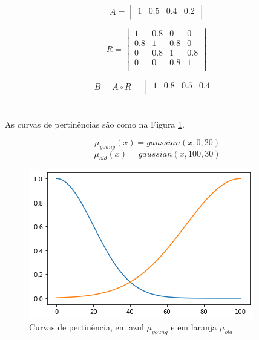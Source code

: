 \documentclass[conference]{IEEEtran}
\newcommand\w{1.0}
\begin{document}
\hfill
\section{}  %

\[
A = 
\begin{vmatrix}
1 & 0.5 & 0.4 & 0.2 \\
\end{vmatrix}
\]

\[
R = 
\begin{vmatrix}
1 & 0.8 & 0 & 0 \\
0.8 & 1 & 0.8 & 0 \\
0 & 0.8 & 1 & 0.8 \\
0 & 0 & 0.8 & 1 \\
\end{vmatrix}
\]

\hfill

\[
B = A \circ R = 
\begin{vmatrix}
1 & 0.8 & 0.5 & 0.4 \\
\end{vmatrix}
\]

\hfill
\section{}  %

\par As curvas de pertinências são como na Figura \ref{fig:plot03}.

\[\mu_{young}(x) = gaussian(x, 0, 20)\]
\[\mu_{old}(x) = gaussian(x, 100, 30)\]

\begin{figure}[htbp]
\centering
\includegraphics[width=\w\linewidth]{fig/plot03.png}
\caption{Curvas de pertinência, em azul $\mu_{young}$ e em laranja $\mu_{old}$}
\label{fig:plot03}
\end{figure}

\hfill
\section{}  %
\end{document}
